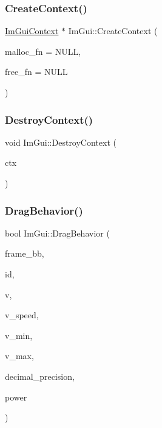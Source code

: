 \subsubsection{\texorpdfstring{Create\+Context()}{CreateContext()}}
{\footnotesize\ttfamily \hyperlink{struct_im_gui_context}{Im\+Gui\+Context} $\ast$ Im\+Gui\+::\+Create\+Context (\begin{DoxyParamCaption}\item[{void $\ast$($\ast$)(size\+\_\+t)}]{malloc\+\_\+fn = {\ttfamily NULL},  }\item[{void($\ast$)(void $\ast$)}]{free\+\_\+fn = {\ttfamily NULL} }\end{DoxyParamCaption})}

\hypertarget{namespace_im_gui_a344adba8bd84069dc7425b88306411c7}{}\label{namespace_im_gui_a344adba8bd84069dc7425b88306411c7} 
\subsubsection{\texorpdfstring{Destroy\+Context()}{DestroyContext()}}
{\footnotesize\ttfamily void Im\+Gui\+::\+Destroy\+Context (\begin{DoxyParamCaption}\item[{\hyperlink{struct_im_gui_context}{Im\+Gui\+Context} $\ast$}]{ctx }\end{DoxyParamCaption})}

\hypertarget{namespace_im_gui_a4fdcba60dbe3762a144051add234ea48}{}\label{namespace_im_gui_a4fdcba60dbe3762a144051add234ea48} 
\subsubsection{\texorpdfstring{Drag\+Behavior()}{DragBehavior()}}
{\footnotesize\ttfamily bool Im\+Gui\+::\+Drag\+Behavior (\begin{DoxyParamCaption}\item[{const \hyperlink{struct_im_rect}{Im\+Rect} \&}]{frame\+\_\+bb,  }\item[{Im\+Gui\+ID}]{id,  }\item[{float $\ast$}]{v,  }\item[{float}]{v\+\_\+speed,  }\item[{float}]{v\+\_\+min,  }\item[{float}]{v\+\_\+max,  }\item[{int}]{decimal\+\_\+precision,  }\item[{float}]{power }\end{DoxyParamCaption})}

